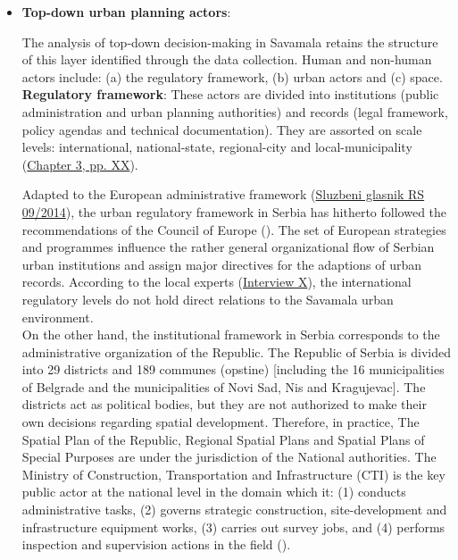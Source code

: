 \documentclass[11pt]{report}
\begin{document}
\begin{itemize}
\item \textbf{Top-down urban planning actors}:

The analysis of top-down decision-making in Savamala retains the structure of this layer identified through the data collection.
Human and non-human actors include:
(a) the regulatory framework,
(b) urban actors
and
(c) space.
\\

\textbf{Regulatory framework}: 
These actors are divided into institutions (public administration and urban planning authorities) and records (legal framework, policy agendas and technical documentation).
They are assorted on scale levels: international, national-state, regional-city and local-municipality (\href{ref}{Chapter 3, pp. XX}). 

Adapted to the European administrative framework (\href{Sluzbeni glasnik}{Sluzbeni glasnik RS 09/2014}), the urban regulatory framework in Serbia has hitherto followed the recommendations of the Council of Europe 
(\href{ref}{\citealt{ministarstvo_prostora_urbani_2014}}). The set of European strategies and programmes influence the rather general organizational flow of Serbian urban institutions and assign major directives for the adaptions of urban records. 
According to the local experts
(\href{InterviewX}{Interview X}),
the international regulatory levels do not hold direct relations to the Savamala urban environment.
\\

On the other hand, the institutional framework in Serbia corresponds to the administrative organization of the Republic. The Republic of Serbia is divided into 29 districts and 189 communes (opstine) [including the 16 municipalities of Belgrade and the  municipalities of Novi Sad, Nis and Kragujevac]. The districts act as political bodies, but they are not authorized to make their own decisions regarding spatial development. Therefore, in practice, The Spatial Plan of the Republic, Regional Spatial Plans and Spatial Plans of Special Purposes are under the jurisdiction of the National authorities. The Ministry of Construction, Transportation and Infrastructure (CTI) is the key public actor at the national level in the domain which it: (1) conducts administrative tasks, (2) governs strategic construction, site-development and infrastructure equipment works, (3) carries out survey jobs, and (4) performs inspection and supervision actions in the field (\href{Maksic}{\citealt{maksic_european_2012}}).
\\


\end{itemize}
\end{document}
